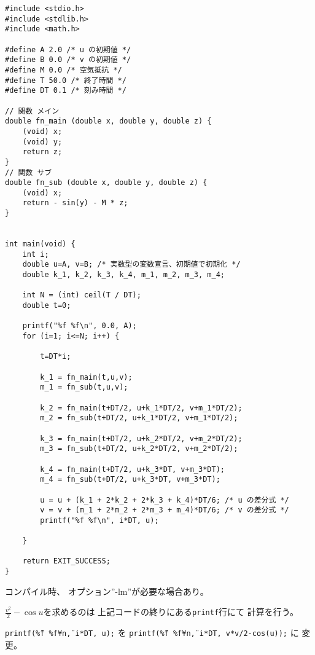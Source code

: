 \documentclass[12pt,b5paper]{ltjsarticle}
\begin{document}
\begin{lstlisting}
#include <stdio.h>
#include <stdlib.h>
#include <math.h>

#define A 2.0 /* u の初期値 */
#define B 0.0 /* v の初期値 */
#define M 0.0 /* 空気抵抗 */
#define T 50.0 /* 終了時間 */
#define DT 0.1 /* 刻み時間 */

// 関数 メイン
double fn_main (double x, double y, double z) {
    (void) x;
    (void) y;
    return z;
}
// 関数 サブ
double fn_sub (double x, double y, double z) {
    (void) x;
    return - sin(y) - M * z;
}


int main(void) {
    int i;
    double u=A, v=B; /* 実数型の変数宣言、初期値で初期化 */
    double k_1, k_2, k_3, k_4, m_1, m_2, m_3, m_4;

    int N = (int) ceil(T / DT);
    double t=0;

    printf("%f %f\n", 0.0, A);
    for (i=1; i<=N; i++) {

        t=DT*i;
        
        k_1 = fn_main(t,u,v);
        m_1 = fn_sub(t,u,v);
        
        k_2 = fn_main(t+DT/2, u+k_1*DT/2, v+m_1*DT/2);
        m_2 = fn_sub(t+DT/2, u+k_1*DT/2, v+m_1*DT/2);
        
        k_3 = fn_main(t+DT/2, u+k_2*DT/2, v+m_2*DT/2);
        m_3 = fn_sub(t+DT/2, u+k_2*DT/2, v+m_2*DT/2);
        
        k_4 = fn_main(t+DT/2, u+k_3*DT, v+m_3*DT);
        m_4 = fn_sub(t+DT/2, u+k_3*DT, v+m_3*DT);
        
        u = u + (k_1 + 2*k_2 + 2*k_3 + k_4)*DT/6; /* u の差分式 */
        v = v + (m_1 + 2*m_2 + 2*m_3 + m_4)*DT/6; /* v の差分式 */
        printf("%f %f\n", i*DT, u);
        
    }
    
    return EXIT_SUCCESS;
}
\end{lstlisting}

コンパイル時、
オプション''-lm''が必要な場合あり。

\dotfill

$\frac{v^2}{2}-\cos u$を求めるのは
上記コードの終りにある\texttt{printf}行にて
計算を行う。

\texttt{printf(\"\%f \%f¥n\", i*DT, u);}
を
\texttt{printf(\"\%f \%f¥n\", i*DT, v*v/2-cos(u));}
に
変更。
\end{document}
